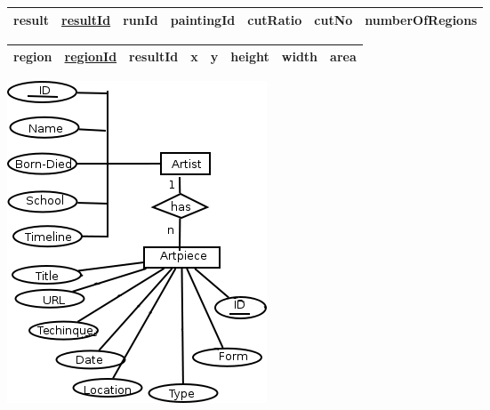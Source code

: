 \begin{center}
\begin{tabular}{|l||c|c|c|c|c|c|}
    \hline
    \bf{result} \hspace{0.5cm} & \underline{resultId} & runId & paintingId & cutRatio & cutNo & numberOfRegions \\\hline
\end{tabular}

\begin{tabular}{|l||c|c|c|c|c|c|c|}
    \hline
    \bf{region} \hspace{0.5cm} & \underline{regionId} & resultId & x & y & height & width & area \\\hline
\end{tabular}
\end{center}

\newpage
\includegraphics[scale=0.9]{afsnit/vores_implementation/billeder/ER}

